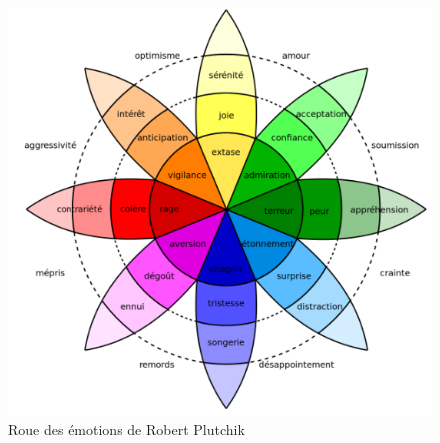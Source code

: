 \begin{figure}[th]
\centering
\includegraphics{Figures/emotions.PNG}
\decoRule
\caption[Roue des émotions de Robert Plutchik]{Roue des émotions de Robert Plutchik}
\label{fig:roue}
\end{figure}


